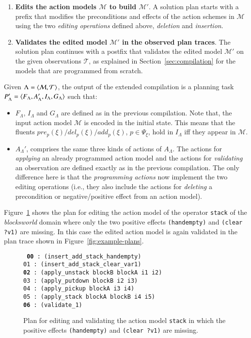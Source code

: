 \begin{enumerate}
\item {\bf Edits the action models $\mathcal{M}$ to build $\mathcal{M}'$}. A solution plan starts with a prefix that modifies the preconditions and effects of the action schemes in $\mathcal{M}$ using the two {\em editing operations} defined above, {\em deletion} and {\em insertion}.
\item {\bf Validates the edited model $\mathcal{M}'$ in the observed plan traces}. The solution plan continues with a postfix that validates the edited model $\mathcal{M}'$ on the given observations $\mathcal{T}$, as explained in Section~\ref{sec:compilation} for the models that are programmed from scratch.
\end{enumerate}

Given $\Lambda={\langle \mathcal{M},\mathcal{T} \rangle}$, the output of the extended compilation is a planning task $P_{\Lambda}'={\langle F_{\Lambda},A_{\Lambda}',I_{\Lambda},G_{\Lambda} \rangle}$ such that:

\begin{itemize}
\item $F_{\Lambda}$, $I_{\Lambda}$ and $G_{\Lambda}$ are defined as in the previous compilation. Note that, the input action model $\mathcal{M}$ is encoded in the initial state. This means that the fluents $pre_p(\xi)/del_p(\xi)/add_p(\xi)$, $p\in \Psi_\xi$, hold in $I_{\Lambda}$ iff they appear in $\mathcal{M}$.
\item $A_{\Lambda}'$, comprises the same three kinds of actions of $A_{\Lambda}$. The actions for {\em applying} an already programmed action model and the actions for {\em validating} an observation are defined exactly as in the previous compilation. The only difference here is that the {\em programming actions} now implement the two editing operations (i.e., they also include the actions for {\em deleting} a precondition or negative/positive effect from an action model).
\end{itemize}

Figure~\ref{fig:plan-pdistance} shows the plan for editing the action model of the operator {\tt\small stack} of the {\em blocksworld} domain where only the two positive effects {\tt\small (handempty)} and {\tt\small (clear ?v1)} are missing. In this case the edited action model is again validated in the plan trace shown in Figure~\ref{fig:example-plans}.

\begin{figure}[hbt!]
{\footnotesize\tt
  {\bf 00} : (insert\_add\_stack\_handempty)\\
  01 : (insert\_add\_stack\_clear\_var1)\\
  {\bf 02} : (apply\_unstack blockB blockA i1 i2)\\
  03 : (apply\_putdown blockB i2 i3)\\
  04 : (apply\_pickup blockA i3 i4)\\
  05 : (apply\_stack blockA blockB i4 i5)\\
  {\bf 06} : (validate\_1)
}
\caption{\small Plan for editing and validating the action model {\tt\small{stack}} in which the positive effects {\tt\small{(handempty)}} and {\tt\small{(clear ?v1)}} are missing.}
\label{fig:plan-pdistance}
\end{figure}

